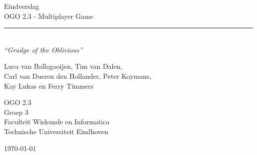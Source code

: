 \begin{titlepage}
	\begin{center}
		
		{\Huge Eindverslag \\[0.5cm]OGO 2.3 - Multiplayer Game}\\[0.5cm]
		\rule{\linewidth}{0.5mm}\\[0.5cm]
				\bigskip
		\huge \textit{``Grudge of the Oblivious''}
		
		{\Large
		Luca van Ballegooijen, Tim van Dalen, \\
		Carl van Dueren den Hollander, Peter Koymans,\\
		Kay Lukas en Ferry Timmers\\[1cm]
		}
		
		{\large
		OGO 2.3\\
		Groep 3 \\[1cm]
		Faculteit Wiskunde en Informatica\\
		Technische Universiteit Eindhoven\\[1cm]
		}
		
		

		\vfill

		{\large \today}
	\end{center}
\end{titlepage}
